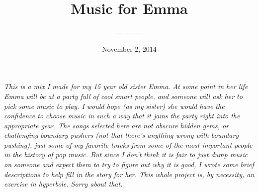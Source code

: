\documentclass[letterpaper,single]{article}
\title{Music for Emma}
\date{November 2, 2014} %
\author{--- --- --- }
\begin{document}
 
\maketitle
\textit{This is a mix I made for my 15 year old sister Emma. At some
point in her life Emma will be at a party full of cool smart people, and
someone will ask her to pick some music to play. I would hope (as my
sister) she would have the confidence to choose music in such a way that
it jams the party right into the appropriate gear. The songs selected
here are not obscure hidden gems, or challenging boundary pushers (not
that there's anything wrong with boundary pushing), just some of my
favorite tracks from some of the most important people in the history
of pop music. But since I don't think it is fair to just dump music on
someone and expect them to try to figure out why it is good, I wrote
some brief descriptions to help fill in the story for her. This whole
project is, by necessity, an exercise in hyperbole. Sorry about that.}\\
\\
\end{document}
